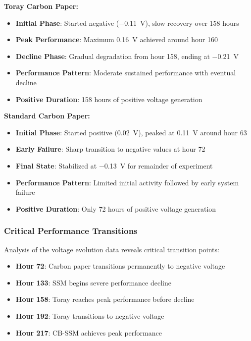 \documentclass[12pt,a4paper]{article}
\begin{document}
\textbf{Toray Carbon Paper:}
\begin{itemize}
    \item \textbf{Initial Phase}: Started negative (\SI{-0.11}{\volt}), slow recovery over 158 hours
    \item \textbf{Peak Performance}: Maximum \SI{+0.16}{\volt} achieved around hour 160
    \item \textbf{Decline Phase}: Gradual degradation from hour 158, ending at \SI{-0.21}{\volt}
    \item \textbf{Performance Pattern}: Moderate sustained performance with eventual decline
    \item \textbf{Positive Duration}: 158 hours of positive voltage generation
\end{itemize}

\textbf{Standard Carbon Paper:}
\begin{itemize}
    \item \textbf{Initial Phase}: Started positive (\SI{+0.02}{\volt}), peaked at \SI{+0.11}{\volt} around hour 63
    \item \textbf{Early Failure}: Sharp transition to negative values at hour 72
    \item \textbf{Final State}: Stabilized at \SI{-0.13}{\volt} for remainder of experiment
    \item \textbf{Performance Pattern}: Limited initial activity followed by early system failure
    \item \textbf{Positive Duration}: Only 72 hours of positive voltage generation
\end{itemize}

\subsubsection{Critical Performance Transitions}

Analysis of the voltage evolution data reveals critical transition points:

\begin{itemize}
    \item \textbf{Hour 72}: Carbon paper transitions permanently to negative voltage
    \item \textbf{Hour 133}: SSM begins severe performance decline
    \item \textbf{Hour 158}: Toray reaches peak performance before decline
    \item \textbf{Hour 192}: Toray transitions to negative voltage
    \item \textbf{Hour 217}: CB-SSM achieves peak performance
\end{itemize}
\end{document}
